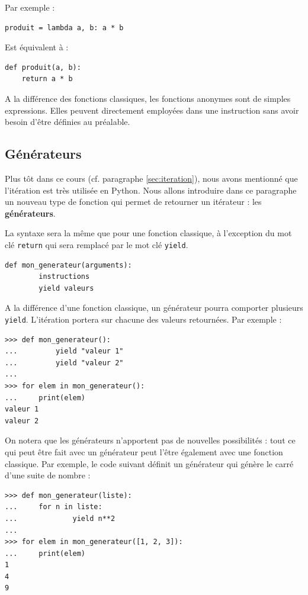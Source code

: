 \documentclass[12pt, a4paper]{article}
\begin{document}
Par exemple : 
\begin{lstlisting}
produit = lambda a, b: a * b
\end{lstlisting}

Est équivalent à :
\begin{lstlisting}
def produit(a, b):
    return a * b
\end{lstlisting}

A la différence des fonctions classiques, les fonctions anonymes sont de simples expressions. Elles peuvent directement employées dans une instruction sans avoir besoin d'être définies au préalable.




\subsection{Générateurs}
Plus tôt dans ce cours (cf. paragraphe \ref{sec:iteration}), nous avons mentionné que l'itération est très utilisée en Python. Nous allons introduire dans ce paragraphe un nouveau type de fonction qui permet de retourner un itérateur : les \textbf{générateurs}.

La syntaxe sera la même que pour une fonction classique, à l'exception du mot clé \lstinline{return} qui sera remplacé par le mot clé \lstinline{yield}.
\begin{lstlisting}
def mon_generateur(arguments):
		instructions
		yield valeurs
\end{lstlisting}

A la différence d'une fonction classique, un générateur pourra comporter plusieurs \lstinline{yield}. L'itération portera sur chacune des valeurs retournées. Par exemple :
\begin{lstlisting}
>>> def mon_generateur():
... 		yield "valeur 1"
... 		yield "valeur 2"
...
>>> for elem in mon_generateur():
...     print(elem)
valeur 1
valeur 2
\end{lstlisting}

On notera que les générateurs n'apportent pas de nouvelles possibilités : tout ce qui peut être fait avec un générateur peut l'être également avec une fonction classique. Par exemple, le code suivant définit un générateur qui génère le carré d'une suite de nombre :
\begin{lstlisting}
>>> def mon_generateur(liste):
...	    for n in liste:
... 		    yield n**2
...
>>> for elem in mon_generateur([1, 2, 3]):
...     print(elem)
1
4
9
\end{lstlisting}
\end{document}
